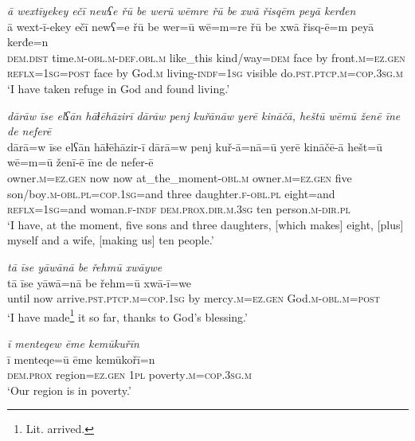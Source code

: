 \ea \label{ŽM.15}
\textit{ā wextīyekey ečī newʕe řū be werū wēmre řū be xwā řisqēm peyā kerđen} \\ 
\gll ā wext-ī-ekey ečī newʕ=e řū be wer=ū wē=m=re řū be xwā řisq-ē=m peyā kerđe=n \\ 
 \textsc{dem.dist} time\textsc{.m}\textsc{-obl}\textsc{.m}\textsc{-def}\textsc{.obl}\textsc{.m} like\_this kind/way\textsc{=dem} face by front\textsc{.m}\textsc{=ez.gen} \textsc{reflx}\textsc{=\textsc{1sg}}\textsc{=\textsc{post}} face by God\textsc{.m} living\textsc{-indf}\textsc{=\textsc{1sg}} visible do\textsc{.pst}\textsc{.ptcp}\textsc{.m}\textsc{=cop}\textsc{.3sg}\textsc{.m} \\ 
\glt `I have taken refuge in God and found living.'
\z 
 
\ea \label{ŽM.16}
\textit{dārāw īse elʕān hāɫēhāzirī dārāw penj kuřānāw yerē kināčā, heštū wēmū ženē īne de neferē} \\ 
\gll dārā=w īse elʕān hāɫēhāzir-ī dārā=w penj kuř-ā=nā=ū yerē kināčē-ā hešt=ū wē=m=ū ženī-ē īne de nefer-ē \\ 
 owner\textsc{.m}\textsc{=ez.gen} now now at\_the\_moment\textsc{-obl}\textsc{.m} owner\textsc{.m}\textsc{=ez.gen} five son/boy\textsc{.m}\textsc{-obl}\textsc{.pl}\textsc{=cop}\textsc{.\textsc{1sg}}=and three daughter\textsc{.f}\textsc{-obl}\textsc{.pl} eight=and \textsc{reflx}\textsc{=\textsc{1sg}}=and woman\textsc{.f}\textsc{-indf} \textsc{dem.prox}\textsc{.dir}\textsc{.m}\textsc{.3sg} ten person\textsc{.m}\textsc{-dir}\textsc{.pl} \\ 
\glt `I have, at the moment, five sons and three daughters, [which makes] eight, [plus] myself and a wife, [making us] ten people.'
\z 
 
\ea \label{ŽM.17}
\textit{tā īse yāwānā be řehmū xwāywe} \\ 
\gll tā īse yāwā=nā be řehm=ū xwā-ī=we \\ 
 until now arrive\textsc{.pst}\textsc{.ptcp}\textsc{.m}\textsc{=cop}\textsc{.\textsc{1sg}} by mercy\textsc{.m}\textsc{=ez.gen} God\textsc{.m}\textsc{-obl}\textsc{.m}\textsc{=\textsc{post}} \\ 
\glt `I have made\footnote{Lit. arrived.} it so far, thanks to God's blessing.'
\z 
 
\ea \label{ŽM.19}
\textit{ī menteqew ēme kemūkuřīn} \\ 
\gll ī menteqe=ū ēme kemūkořī=n \\ 
 \textsc{dem.prox} region\textsc{=ez.gen} \textsc{1pl} poverty\textsc{.m}\textsc{=cop}\textsc{.3sg}\textsc{.m} \\ 
\glt `Our region is in poverty.'
\z 
 
